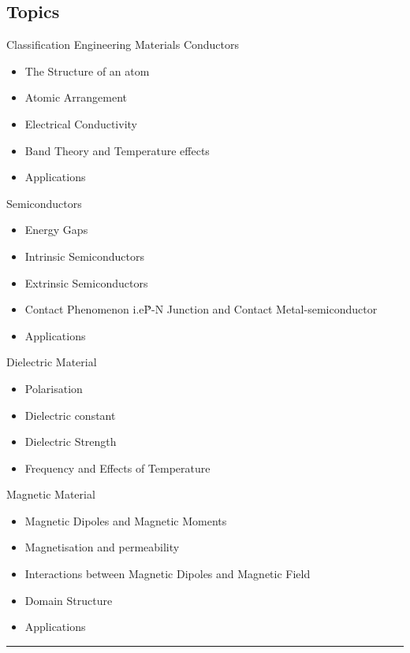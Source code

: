 \subsection*{Topics}
\begin{outline}
    \1 Classification Engineering Materials
    \1 Conductors
    \begin{itemize}
        \item The Structure of an atom
        \item Atomic Arrangement
        \item Electrical Conductivity
        \item Band Theory and Temperature effects
        \item Applications
    \end{itemize}
    \1 Semiconductors
    \begin{itemize}
        \item Energy Gaps
        \item Intrinsic Semiconductors
        \item Extrinsic Semiconductors
        \item Contact Phenomenon i.e\. P-N Junction and Contact Metal-semiconductor
        \item Applications
    \end{itemize}
    \1 Dielectric Material
    \begin{itemize}
        \item Polarisation
        \item Dielectric constant
        \item Dielectric Strength
        \item Frequency and Effects of Temperature
    \end{itemize}
    \1 Magnetic Material
    \begin{itemize}
        \item Magnetic Dipoles and Magnetic Moments
        \item Magnetisation and permeability
        \item Interactions between Magnetic Dipoles and Magnetic Field
        \item Domain Structure
        \item Applications
    \end{itemize}
\end{outline}
\vspace{2ex} \hrule\vspace{2ex}

